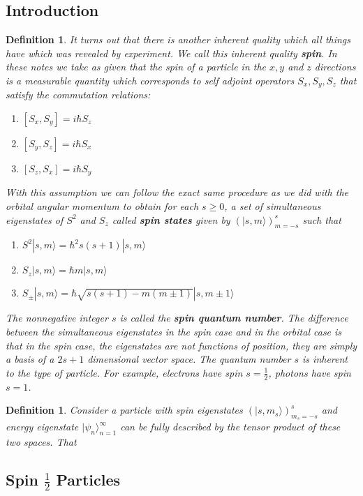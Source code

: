 \documentclass[12pt]{amsart}
\newtheorem{defn}[thm]{Definition}
\renewcommand{\r}{\rangle}
\begin{document}
\subsection{Introduction}

\begin{defn}
It turns out that there is another inherent quality which all things have which was revealed by experiment. We call this inherent quality \textbf{spin}. In these notes we take as given that the spin of a particle in the $x,y$ and $z$ directions is a measurable quantity which  corresponds to self adjoint operators $S_x, S_y, S_z$ that satisfy the commutation relations: 
\begin{enumerate}
\item $[S_x, S_y] = i\hbar S_z$
\item $[S_y, S_z] = i\hbar S_x$
\item $[S_z, S_x] = i\hbar S_y$
\end{enumerate}
With this assumption we can follow the exact same procedure as we did with the orbital angular momentum  to obtain for each $s \geq 0$, a set of simultaneous eigenstates of $S^2$ and $S_z$ called \textbf{spin states} given by $(|s, m \r)_{m=-s}^s$ such that 
\begin{enumerate}
\item $S^2|s, m \r = \hbar^2 s(s+1)|s, m \r$
\item $S_z |s, m \r = \hbar m |s, m \r$
\item $S_{\pm}|s, m \r = \hbar\sqrt{s(s+1) - m(m \pm 1)}|s, m \pm 1 \r$
\end{enumerate} 
The nonnegative integer $s$ is called the \textbf{spin quantum number}. The difference between the simultaneous eigenstates in the spin case and in the orbital case is that in the spin case, the eigenstates are not functions of position, they are simply a basis of a $2s + 1$ dimensional vector space. The quantum number $s$ is inherent to the type of particle. For example, electrons have spin $s = \frac{1}{2}$, photons have spin $s = 1$. 
\end{defn}

\begin{defn}
Consider a particle with spin eigenstates $(| s, m_s\r)_{m_s = -s}^s$ and energy eigenstate $|\psi_n \r_{n=1}^{\infty}$ can be fully described by the tensor product of these two spaces. That 
\end{defn}

\subsection{Spin $\frac{1}{2}$ Particles}
\end{document}
